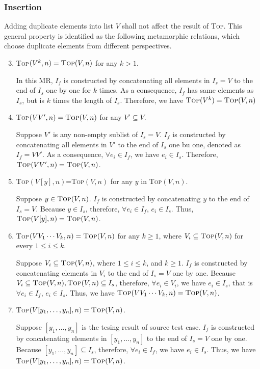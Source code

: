 \documentclass[conference]{IEEEtran}
\theoremstyle{remark}
\newcommand{\Fn}{\textsc{Top}}
\newcommand{\MR}{\textit{MR}}
\begin{document}
\subsubsection{Insertion}
Adding duplicate elements into list $V$ shall not affect the result of \Fn. This general property is  identified as the following metamorphic relations, which choose duplicate elements from different perspectives.
\begin{enumerate}[\MR-1]
\setcounter{enumi}{2}

\item \Fn$(V^k,n)=\Fn(V,n)$ for any $k>1$.

In this MR, $I_f$ is constructed by concatenating all elements in $I_s = V$ to the end of $I_s$ one by one for $k$ times. As a consequence, $I_f$ has same elements as $I_s$, but is $k$ times the length of $I_s$. Therefore, we have $\Fn(V^k) = \Fn(V,n)$

\item \Fn$(VV',n)=\Fn(V,n)$ for any $V'\subseteq V$.

Suppose $V'$ is any non-empty sublist of $I_s = V$. $I_f$ is constructed by concatenating all elements in $V'$ to the end of $I_s$ one bu one, denoted as $I_f = VV'$. As a consequence, $\forall e_i \in I_f$, we have $e_i \in I_s$. Therefore, $\Fn(VV', n) = \Fn(V, n)$.

\item \Fn$(V[y],n)$=\Fn$(V,n)$ for any $y$ in \Fn$(V,n)$.

Suppose $y \in \Fn(V, n)$. $I_f$ is constructed by concatenating $y$ to the end of $I_s = V$. Because $y \in I_s$, therefore, $\forall e_i \in I_f$, $e_i \in I_s$. Thus, $\Fn(V[y],n)=\Fn(V,n)$.

\item \Fn$(VV_1\cdots V_k,n)=\Fn(V,n)$ for any $k\geq 1$, where $V_i\subseteq\Fn(V,n)$ for every $1\leq i\leq k$.

Suppose $V_i \subseteq \Fn(V,n)$, where $1 \leq i \leq k$, and $k \ge 1$. $I_f$ is constructed by concatenating elements in $V_i$ to the end of $I_s = V$ one by one. Because $V_i \subseteq \Fn(V,n), \Fn(V,n) \subseteq I_s$, therefore, $\forall e_i \in V_i$, we have $e_i \in I_s$, that is $\forall e_i \in I_f$, $e_i \in I_s$. Thus, we have $\Fn(VV_1 \cdots V_k, n) = \Fn(V, n)$.

\item \Fn$(V[y_1, \ldots, y_n],n)=\Fn(V,n)$.

Suppose $[y_1, \ldots, y_n]$ is the tesing result of source test case. $I_f$ is constructed by concatenating elements in $[y_1, \ldots, y_n]$ to the end of $I_s = V$ one by one. Because $[y_1, \ldots, y_n] \subseteq I_s$, therefore, $\forall e_i \in I_f$, we have $e_i \in I_s$. Thus, we have \Fn$(V[y_1, \ldots, y_n],n)=\Fn(V,n)$. 


\end{enumerate}
\end{document}
